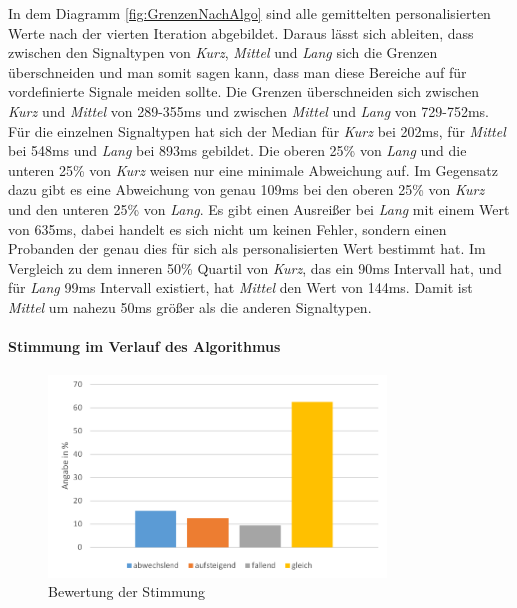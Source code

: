In dem Diagramm \autoref{fig:GrenzenNachAlgo} sind alle gemittelten personalisierten Werte nach der vierten Iteration abgebildet. 
Daraus l{\"a}sst sich ableiten, dass zwischen den Signaltypen von \textit{Kurz}, \textit{Mittel} und \textit{Lang} sich die Grenzen {\"u}berschneiden und man somit sagen kann, dass man diese Bereiche auf f{\"u}r vordefinierte Signale meiden sollte. 
Die Grenzen {\"u}berschneiden sich zwischen \textit{Kurz} und \textit{Mittel} von 289-355ms und zwischen \textit{Mittel} und \textit{Lang} von 729-752ms.
F{\"u}r die einzelnen Signaltypen hat sich der Median f{\"u}r \textit{Kurz} bei 202ms, f{\"u}r \textit{Mittel} bei 548ms und \textit{Lang} bei 893ms gebildet.
Die oberen 25\% von \textit{Lang} und die unteren 25\% von \textit{Kurz} weisen nur eine minimale Abweichung auf. 
Im Gegensatz dazu gibt es eine Abweichung von genau 109ms bei den oberen 25\% von \textit{Kurz} und den unteren 25\% von \textit{Lang}.
Es gibt einen Ausrei{\ss}er bei \textit{Lang} mit einem Wert von 635ms, dabei handelt es sich nicht um keinen Fehler, sondern einen Probanden der genau dies f{\"u}r sich als personalisierten Wert bestimmt hat.
Im Vergleich zu dem inneren 50\% Quartil von \textit{Kurz}, das ein 90ms Intervall hat, und f{\"u}r \textit{Lang} 99ms Intervall existiert, hat \textit{Mittel} den Wert von 144ms. Damit ist \textit{Mittel} um nahezu 50ms gr{\"o}{\ss}er als die anderen Signaltypen.


\paragraph{Stimmung im Verlauf des Algorithmus}

\begin{figure}[htbp] 
            \centering
   	\includegraphics[width=0.8\textwidth]{pics/analyse/person/Stimmung.png}
	\caption{Bewertung der Stimmung}
	\label{fig:Stimmung}
\end{figure}

